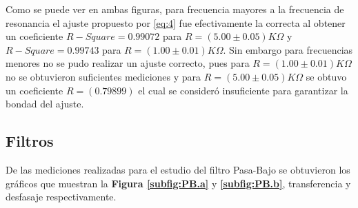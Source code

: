 \documentclass[11pt,a4paper]{article}
\begin{document}
Como se puede ver en ambas figuras, para frecuencia mayores a la frecuencia de resonancia el ajuste propuesto por \eqref{eq:4} fue efectivamente la correcta al obtener un coeficiente $R-Square=0.99072$ para $R=(5.00 \pm 0.05)K\Omega$ y $R-Square=0.99743$ para $R=(1.00 \pm 0.01)K\Omega$. Sin embargo para frecuencias menores no se pudo realizar un ajuste correcto, pues para $R=(1.00 \pm 0.01)K\Omega$ no se obtuvieron suficientes mediciones y para $R=(5.00 \pm 0.05)K\Omega$ se obtuvo un coeficiente $R=(0.79899)$ el cual se consideró insuficiente para garantizar la bondad del ajuste.

\newpage

\subsection{Filtros}

De las mediciones realizadas para el estudio del filtro Pasa-Bajo se obtuvieron los gráficos que muestran la \textbf{Figura \ref{subfig:PB.a}} y \textbf{\ref{subfig:PB.b}}, transferencia y desfasaje respectivamente.
\end{document}
